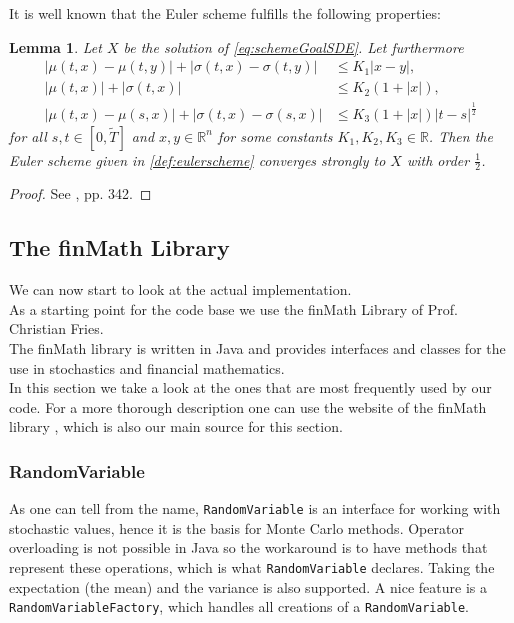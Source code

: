 \documentclass[12pt]{article}
\newtheorem{lemma}[theorem]{Lemma}
\begin{document}
	It is well known that the Euler scheme fulfills the  following properties:
	\begin{lemma}
		Let $X$ be the solution of \cref{eq:schemeGoalSDE}.
		Let furthermore 
		\begin{align*}
			|\mu(t,x) - \mu(t,y)| + |\sigma(t,x) - \sigma(t,y)| &\le K_1 |x - y|,\\
			|\mu(t,x)| + |\sigma(t,x)| &\le K_2(1+|x|),\\
			|\mu(t,x) - \mu(s,x)| + |\sigma(t,x) - \sigma(s,x)| &\le K_3 (1+|x|) |t - s|^{\frac{1}{2}}
		\end{align*}
		for all $s,t \in \left[0,\tilde{T}\right]$ and $x,y\in \mathbb{R}^n$ for some constants $K_1, K_2, K_3 \in \mathbb{R}$.
		Then the Euler scheme given in \cref{def:eulerscheme} converges strongly to $X$ with order $\frac{1}{2}$.
	\end{lemma}
	\begin{proof}
		See \cite{kloedenSchemes}, pp. 342.
	\end{proof}
	
	
	\subsection{The finMath Library}
	We can now start to look at the actual implementation.\\
	As a starting point for the code base we use the finMath Library of Prof. Christian Fries.\\
	The finMath library is written in Java and provides interfaces and classes for the use in stochastics and financial mathematics.\\
	In this section we take a look at the ones that are most frequently used by our code. For a more thorough description one can use the website of the finMath library \cite{finmathWebsite}, which is also our main source for this section.
	
	\subsubsection*{RandomVariable}
	As one can tell from the name, \texttt{RandomVariable} is an interface for working with stochastic values, hence it is the basis for Monte Carlo methods. Operator overloading is not possible in Java so the workaround is to have methods that represent these operations, which is what \texttt{RandomVariable} declares.
	Taking the expectation (the mean) and the variance is also supported. A nice feature is a \texttt{RandomVariableFactory}, which handles all creations of a \texttt{RandomVariable}.
	
\end{document}
